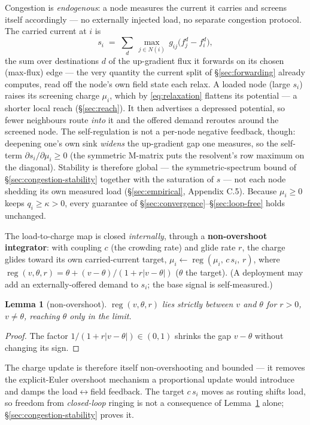 \documentclass[11pt]{article}
\theoremstyle{plain}
\newtheorem{lemma}[theorem]{Lemma}
\numberwithin{equation}{section}
\begin{document}
Congestion is \emph{endogenous}: a node measures the current it carries and screens itself accordingly — no externally injected load, no separate congestion protocol. The carried current at $i$ is
\[
  s_i \;=\; \sum_{d}\,\max_{j\in N(i)}\, g_{ij}\big(f^d_j-f^d_i\big),
\]
the sum over destinations $d$ of the up-gradient flux it forwards on its chosen (max-flux) edge — the very quantity the current split of §\ref{sec:forwarding} already computes, read off the node's own field state each relax. A loaded node (large $s_i$) raises its screening charge $\mu_i$, which by \eqref{eq:relaxation} flattens its potential — a shorter local reach (§\ref{sec:reach}). It then advertises a depressed potential, so fewer neighbours route \emph{into} it and the offered demand reroutes around the screened node. The self-regulation is not a per-node negative feedback, though: deepening one's own sink \emph{widens} the up-gradient gap one measures, so the self-term $\partial s_i/\partial\mu_i\ge0$ (the symmetric M-matrix puts the resolvent's row maximum on the diagonal). Stability is therefore global — the symmetric-spectrum bound of §\ref{sec:congestion-stability} together with the saturation of $s$ — not each node shedding its own measured load (§\ref{sec:empirical}, Appendix C.5). Because $\mu_i\ge 0$ keeps $q_i\ge\kappa>0$, every guarantee of §\ref{sec:convergence}–§\ref{sec:loop-free} holds unchanged.

The load-to-charge map is closed \emph{internally}, through a \textbf{non-overshoot integrator}: with coupling $c$ (the crowding rate) and glide rate $r$, the charge glides toward its own carried-current target, $\mu_i\leftarrow\operatorname{reg}(\mu_i,\,c\,s_i,\,r)$, where $\operatorname{reg}(v,\theta,r)=\theta+(v-\theta)/(1+r\lvert v-\theta\rvert)$ ($\theta$ the target). (A deployment may add an externally-offered demand to $s_i$; the base signal is self-measured.)

\begin{lemma}[non-overshoot]\label{lem:nonovershoot}
$\operatorname{reg}(v,\theta,r)$ lies strictly between $v$ and $\theta$ for $r>0$, $v\neq\theta$, reaching $\theta$ only in the limit.
\end{lemma}
\begin{proof}
The factor $1/(1+r\lvert v-\theta\rvert)\in(0,1)$ shrinks the gap $v-\theta$ without changing its sign.
\end{proof}

The charge update is therefore itself non-overshooting and bounded — it removes the explicit-Euler overshoot mechanism a proportional update would introduce and damps the load$\leftrightarrow$field feedback. The target $c\,s_i$ moves as routing shifts load, so freedom from \emph{closed-loop} ringing is not a consequence of Lemma~\ref{lem:nonovershoot} alone; §\ref{sec:congestion-stability} proves it.
\end{document}
